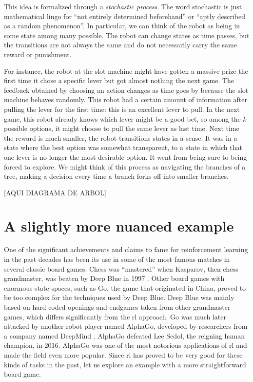 This idea is formalized through a \textit{stochastic process}. The word
stochastic is just mathematical lingo for ``not entirely determined beforehand''
or ``aptly described as a random phenomenon''. In particular, we can think of
the robot as being in some state among many possible. The robot can change
states as time passes, but the transitions are not always the same and do not
necessarily carry the same reward or punishment.

For instance, the robot at the slot machine might have gotten a massive prize
the first time it chose a specific lever but got almost nothing the next game.
The feedback obtained by choosing an action changes as time goes by because the
slot machine behaves randomly. This robot had a certain amount of information
after pulling the lever for the first time: this is an excellent lever to pull.
In the next game, this robot already knows which lever might be a good bet, so
among the $k$ possible options, it might choose to pull the same lever as last
time. Next time the reward is much smaller, the robot transitions states in a
sense. It was in a state where the best option was somewhat transparent, to a
state in which that one lever is no longer the most desirable option. It went
from being sure to being forced to explore. We might think of this process as
navigating the branches of a tree, making a decision every time a branch forks
off into smaller branches.

[AQUI DIAGRAMA DE ARBOL]

\section{A slightly more nuanced example}

One of the significant achievements and claims to fame for reinforcement
learning in the past decades has been its use in some of the most famous matches
in several classic board games. Chess was ``mastered'' when Kasparov, then chess
grandmaster, was beaten by Deep Blue in 1997 \cite{silverchess}. Other board
games with enormous state spaces, such as Go, the game that originated in China,
proved to be too complex for the techniques used by Deep Blue. Deep Blue was
mainly based on hard-coded openings and end\-ga\-mes taken from other grandmaster
games, which differs significantly from the \ac{rl} approach. Go was much later
attacked by another robot player named AlphaGo, developed by researchers from a
company named DeepMind \cite{silver2017mastering}. AlphaGo defeated Lee Sedol,
the reigning human champion, in 2016. AlphaGo was one of the most notorious
applications of \ac{rl} and made the field even more popular. Since \ac{rl} has
proved to be very good for these kinds of tasks in the past, let us explore an
example with a more straightforward board game.

